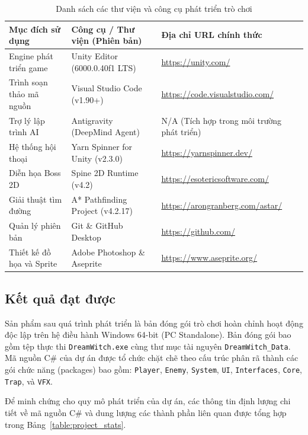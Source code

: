 \documentclass[../DoAn.tex]{subfiles}
\begin{document}
\begin{table}[H]
\centering
\begin{tabular}{|p{3.0cm}|p{4.5cm}|p{5.0cm}|}
\hline
\textbf{Mục đích sử dụng} & \textbf{Công cụ / Thư viện (Phiên bản)} & \textbf{Địa chỉ URL chính thức} \\ \hline
Engine phát triển game & Unity Editor (6000.0.40f1 LTS) & \url{https://unity.com/} \\ \hline
Trình soạn thảo mã nguồn & Visual Studio Code (v1.90+) & \url{https://code.visualstudio.com/} \\ \hline
Trợ lý lập trình AI & Antigravity (DeepMind Agent) & N/A (Tích hợp trong môi trường phát triển) \\ \hline
Hệ thống hội thoại & Yarn Spinner for Unity (v2.3.0) & \url{https://yarnspinner.dev/} \\ \hline
Diễn họa Boss 2D & Spine 2D Runtime (v4.2) & \url{https://esotericsoftware.com/} \\ \hline
Giải thuật tìm đường & A* Pathfinding Project (v4.2.17) & \url{https://arongranberg.com/astar/} \\ \hline
Quản lý phiên bản & Git \& GitHub Desktop & \url{https://github.com/} \\ \hline
Thiết kế đồ họa và Sprite & Adobe Photoshop \& Aseprite & \url{https://www.aseprite.org/} \\ \hline
\end{tabular}
\caption{Danh sách các thư viện và công cụ phát triển trò chơi}
\label{table:development_tools}
\end{table}

\subsection{Kết quả đạt được}
\label{subsection:5.4.2}
Sản phẩm sau quá trình phát triển là bản đóng gói trò chơi hoàn chỉnh hoạt động độc lập trên hệ điều hành Windows 64-bit (PC Standalone). Bản đóng gói bao gồm tệp thực thi \texttt{DreamWitch.exe} cùng thư mục tài nguyên \texttt{DreamWitch\_Data}. Mã nguồn C\# của dự án được tổ chức chặt chẽ theo cấu trúc phân rã thành các gói chức năng (packages) bao gồm: \texttt{Player}, \texttt{Enemy}, \texttt{System}, \texttt{UI}, \texttt{Interfaces}, \texttt{Core}, \texttt{Trap}, và \texttt{VFX}.

Để minh chứng cho quy mô phát triển của dự án, các thông tin định lượng chi tiết về mã nguồn C\# và dung lượng các thành phần liên quan được tổng hợp trong Bảng~\ref{table:project_stats}.
\end{document}
